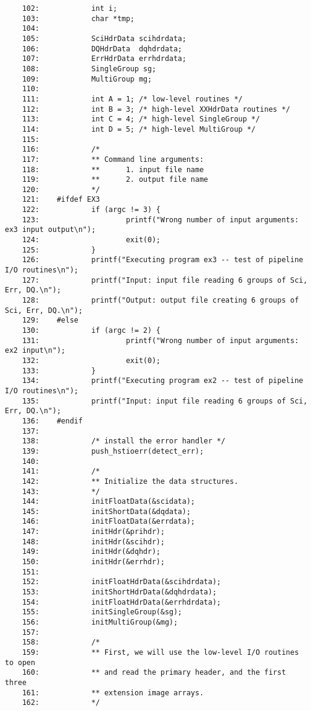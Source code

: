 \begin{scriptsize}
\begin{verbatim}
    102:            int i;
    103:            char *tmp;
    104:    
    105:            SciHdrData scihdrdata;
    106:            DQHdrData  dqhdrdata;
    107:            ErrHdrData errhdrdata;
    108:            SingleGroup sg;
    109:            MultiGroup mg;
    110:    
    111:            int A = 1; /* low-level routines */
    112:            int B = 3; /* high-level XXHdrData routines */
    113:            int C = 4; /* high-level SingleGroup */
    114:            int D = 5; /* high-level MultiGroup */
    115:    
    116:            /*
    117:            ** Command line arguments: 
    118:            **      1. input file name
    119:            **      2. output file name
    120:            */
    121:    #ifdef EX3
    122:            if (argc != 3) {
    123:                    printf("Wrong number of input arguments: ex3 input output\n");
    124:                    exit(0);
    125:            }
    126:            printf("Executing program ex3 -- test of pipeline I/O routines\n");
    127:            printf("Input: input file reading 6 groups of Sci, Err, DQ.\n");
    128:            printf("Output: output file creating 6 groups of Sci, Err, DQ.\n");
    129:    #else
    130:            if (argc != 2) {
    131:                    printf("Wrong number of input arguments: ex2 input\n");
    132:                    exit(0);
    133:            }
    134:            printf("Executing program ex2 -- test of pipeline I/O routines\n");
    135:            printf("Input: input file reading 6 groups of Sci, Err, DQ.\n");
    136:    #endif
    137:    
    138:            /* install the error handler */
    139:            push_hstioerr(detect_err);
    140:    
    141:            /*
    142:            ** Initialize the data structures.
    143:            */
    144:            initFloatData(&scidata);
    145:            initShortData(&dqdata);
    146:            initFloatData(&errdata);
    147:            initHdr(&prihdr);
    148:            initHdr(&scihdr);
    149:            initHdr(&dqhdr);
    150:            initHdr(&errhdr);
    151:    
    152:            initFloatHdrData(&scihdrdata);
    153:            initShortHdrData(&dqhdrdata);
    154:            initFloatHdrData(&errhdrdata);
    155:            initSingleGroup(&sg);
    156:            initMultiGroup(&mg);
    157:    
    158:            /*
    159:            ** First, we will use the low-level I/O routines to open
    160:            ** and read the primary header, and the first three
    161:            ** extension image arrays.
    162:            */

\end{verbatim}
\end{scriptsize}
